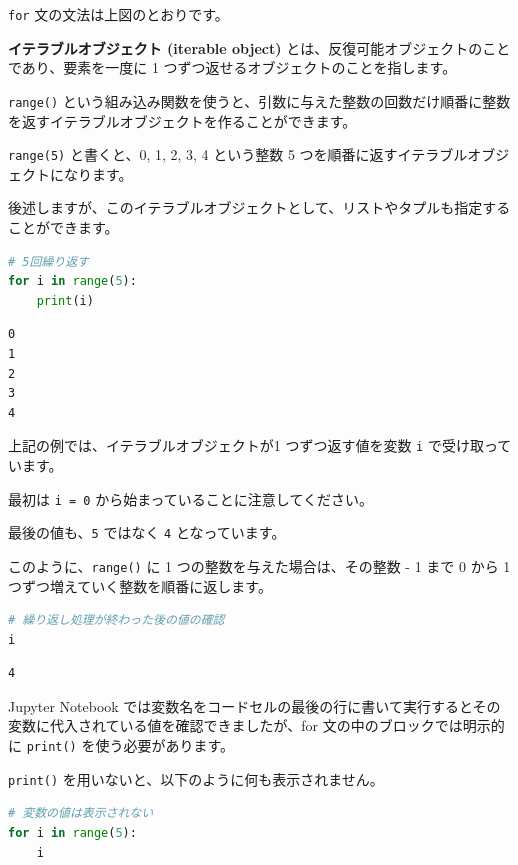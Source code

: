 \texttt{for} 文の文法は上図のとおりです。


\textbf{イテラブルオブジェクト (iterable object)} とは、反復可能オブジェクトのことであり、要素を一度に 1 つずつ返せるオブジェクトのことを指します。

\texttt{range()} という組み込み関数を使うと、引数に与えた整数の回数だけ順番に整数を返すイテラブルオブジェクトを作ることができます。

\texttt{range(5)} と書くと、0, 1, 2, 3, 4 という整数 5 つを順番に返すイテラブルオブジェクトになります。


後述しますが、このイテラブルオブジェクトとして、リストやタプルも指定することができます。


\begin{lstlisting}[style=codecell,language=Python]
# 5回繰り返す
for i in range(5):
    print(i)
\end{lstlisting}

\begin{lstlisting}[style=outputcell]
0
1
2
3
4
\end{lstlisting}

上記の例では、イテラブルオブジェクトが1 つずつ返す値を変数 \texttt{i} で受け取っています。

最初は \texttt{i = 0} から始まっていることに注意してください。

最後の値も、\texttt{5} ではなく \texttt{4} となっています。

このように、\texttt{range()} に 1 つの整数を与えた場合は、その整数 - 1 まで 0 から 1 つずつ増えていく整数を順番に返します。


\begin{lstlisting}[style=codecell,language=Python]
# 繰り返し処理が終わった後の値の確認
i
\end{lstlisting}

\begin{lstlisting}[style=outputcell]
4
\end{lstlisting}

Jupyter Notebook では変数名をコードセルの最後の行に書いて実行するとその変数に代入されている値を確認できましたが、for 文の中のブロックでは明示的に \texttt{print()} を使う必要があります。

\texttt{print()} を用いないと、以下のように何も表示されません。


\begin{lstlisting}[style=codecell,language=Python]
# 変数の値は表示されない
for i in range(5):
    i
\end{lstlisting}

